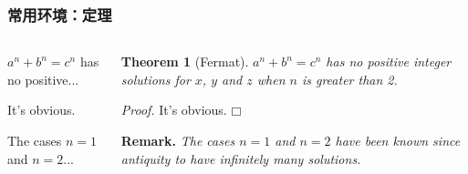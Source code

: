 \begin{frame}[fragile]
\frametitle{常用环境：定理}
\begin{columns}
\begin{column}{0.57\textwidth}
  \begin{texcode}[gobble=4, moredelim={[is][emphstyle]{!}{!}}, moretexcs={\newtheorem*},
      emph={[2]amsthm}]
    \usepackage{amsthm}
    \newtheorem{theorem}{Theorem}
    \newtheorem*{remark}{Remark} %

    \begin{!theorem!}[Fermat]
      $a^n+b^n=c^n$ has no positive...
    \end{!theorem!}
    \begin{!proof!}
      It's obvious.
    \end{!proof!}
    \begin{!remark!}
      The cases $n=1$ and $n=2$...
    \end{!remark!}
  \end{texcode}
\end{column}
\pause
\begin{column}{0.33\textwidth}
  \footnotesize
  \setlength{\parskip}{0.5em}
  \setlength{\parindent}{0pt}

  \textbf{Theorem 1} (Fermat). \textit{$a^n+b^n=c^n$ has no positive integer solutions
    for $x$, $y$ and $z$ when $n$ is greater than 2.}

  \textit{Proof.} It's obvious. \hfill $\mdlgwhtsquare$

  \textbf{Remark.} \textit{The cases $n=1$ and $n=2$ have been known since antiquity
    to have infinitely many solutions.}
\end{column}
\end{columns}
\end{frame}

